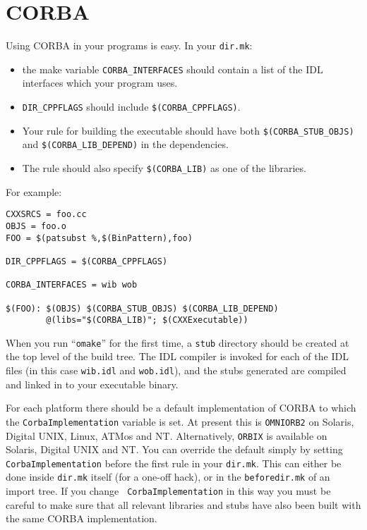 \documentclass[11pt,twoside,onecolumn]{article}
\begin{document}
\section{CORBA}

Using CORBA in your programs is easy.  In your {\tt dir.mk}:
\begin{itemize}
\item the make variable \verb|CORBA_INTERFACES| should contain a list of the
IDL interfaces which your program uses.
\item \verb|DIR_CPPFLAGS| should include \verb|$(CORBA_CPPFLAGS)|.
\item Your rule for building the executable should have both
\verb|$(CORBA_STUB_OBJS)| and \verb|$(CORBA_LIB_DEPEND)| in the dependencies.
\item The rule should also specify \verb|$(CORBA_LIB)| as one of the libraries.
\end{itemize}
For example:

{\small \begin{verbatim}
CXXSRCS = foo.cc
OBJS = foo.o
FOO = $(patsubst %,$(BinPattern),foo)

DIR_CPPFLAGS = $(CORBA_CPPFLAGS)

CORBA_INTERFACES = wib wob

$(FOO): $(OBJS) $(CORBA_STUB_OBJS) $(CORBA_LIB_DEPEND)
        @(libs="$(CORBA_LIB)"; $(CXXExecutable))
\end{verbatim}}

When you run ``{\tt omake}'' for the first time, a {\tt stub} directory should
be created at the top level of the build tree.  The IDL compiler is invoked for
each of the IDL files (in this case {\tt wib.idl} and {\tt wob.idl}), and the
stubs generated are compiled and linked in to your executable binary.

For each platform there should be a default implementation of CORBA to which
the {\tt CorbaImplementation} variable is set. At present this is 
{\tt OMNIORB2} on Solaris, Digital UNIX, Linux, ATMos and
NT. Alternatively, {\tt ORBIX} is available on Solaris, Digital UNIX and NT.
You can override the default simply by setting
{\tt CorbaImplementation} before the first rule in your {\tt dir.mk}.
This can either be done inside {\tt dir.mk} itself (for a one-off hack), or in
the {\tt beforedir.mk} of an import tree.  If you change {\tt
CorbaImplementation} in this way you must be careful to make sure that all
relevant libraries and stubs have also been built with the same CORBA
implementation.
\end{document}
